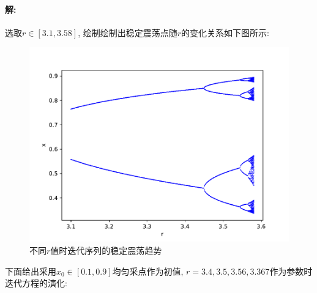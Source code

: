 \documentclass[a4paper,zihao=5,UTF8]{ctexart}
\begin{document}
    \paragraph{解:}
    选取$r\in[3.1, 3.58]$, 绘制绘制出稳定震荡点随$r$的变化关系如下图所示:
    \begin{figure}[htbp]
        \centering
        \includegraphics[scale=0.5]{5_1.pdf}
        \caption{不同$r$值时迭代序列的稳定震荡趋势}
    \end{figure}
    \par 
    下面给出采用$x_0\in[0.1,0.9]$均匀采点作为初值, $r=3.4,3.5,3.56,3.367$作为参数时迭代方程的演化:
\end{document}
